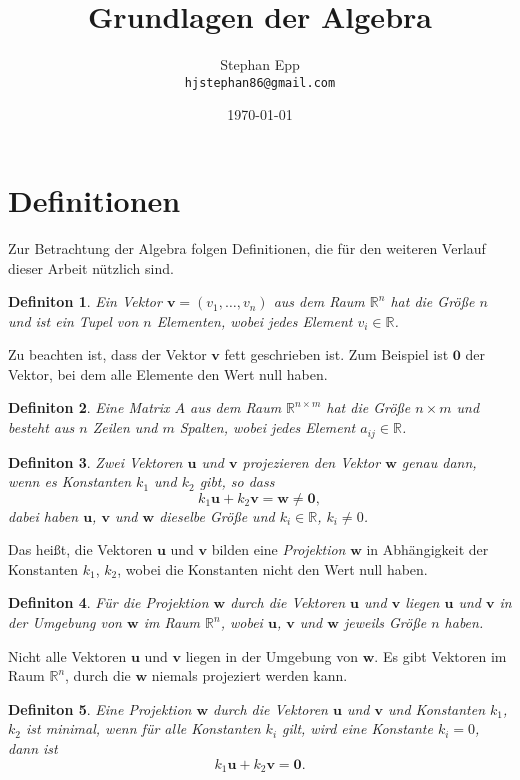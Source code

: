 \documentclass{scrartcl}
\title{Grundlagen der Algebra}
\author{Stephan Epp\\\texttt{hjstephan86@gmail.com}}
\date{\today}
\newtheorem{definition}{Definiton}[section]
\numberwithin{equation}{section}
\begin{document}
	\maketitle
	\vspace{5em}
	\tableofcontents
	\newpage
\section{Definitionen}
Zur Betrachtung der Algebra folgen Definitionen, die für den weiteren Verlauf dieser Arbeit nützlich sind.
\begin{definition}
	Ein Vektor $\boldsymbol{v} = (v_1, \ldots, v_n)$ aus dem Raum $\mathbb{R}^n$ hat die Größe $n$ und ist ein Tupel von $n$ Elementen, wobei jedes Element $v_i \in \mathbb{R}$.
\end{definition}
Zu beachten ist, dass der Vektor $\boldsymbol{v}$ fett geschrieben ist. Zum Beispiel ist $\boldsymbol{0}$ der Vektor, bei dem alle Elemente den Wert null haben.
\begin{definition}
	Eine Matrix $A$ aus dem Raum $\mathbb{R}^{n \times m}$ hat die Größe $n \times m$ und besteht aus $n$ Zeilen und $m$ Spalten, wobei jedes Element $a_{ij} \in \mathbb{R}$.
\end{definition}
\begin{definition}
   	Zwei Vektoren $\boldsymbol{u}$ und $\boldsymbol{v}$ projezieren den Vektor $\boldsymbol{w}$ genau dann, wenn es Konstanten $k_1$ und $k_2$ gibt, so dass $$k_1 \boldsymbol{u} + k_2\boldsymbol{v} = \boldsymbol{w} \neq \boldsymbol{0},$$ dabei haben $\boldsymbol{u}$, $\boldsymbol{v}$ und $\boldsymbol{w}$ dieselbe Größe und $k_i \in \mathbb{R}$, $k_i \neq 0$.
\end{definition}
Das heißt, die Vektoren $\boldsymbol{u}$ und $\boldsymbol{v}$ bilden eine \textit{Projektion} $\boldsymbol{w}$ in Abhängigkeit der Konstanten $k_1$, $k_2$, wobei die Konstanten nicht den Wert null haben.
\begin{definition}
	Für die Projektion $\boldsymbol{w}$ durch die Vektoren $\boldsymbol{u}$ und $\boldsymbol{v}$ liegen $\boldsymbol{u}$ und $\boldsymbol{v}$ in der Umgebung von $\boldsymbol{w}$ im Raum $\mathbb{R}^n$, wobei $\boldsymbol{u}$, $\boldsymbol{v}$ und $\boldsymbol{w}$ jeweils Größe $n$ haben.
\end{definition}
Nicht alle Vektoren $\boldsymbol{u}$ und $\boldsymbol{v}$ liegen in der Umgebung von $\boldsymbol{w}$. Es gibt Vektoren im Raum $\mathbb{R}^n$, durch die $\boldsymbol{w}$ niemals projeziert werden kann.
\begin{definition}
	Eine Projektion $\boldsymbol{w}$ durch die Vektoren $\boldsymbol{u}$ und $\boldsymbol{v}$ und Konstanten $k_1$, $k_2$ ist minimal, wenn für alle Konstanten $k_i$ gilt, wird eine Konstante $k_i = 0$, dann ist $$k_1 \boldsymbol{u} + k_2\boldsymbol{v} = \boldsymbol{0}.$$
\end{definition}
\end{document}
